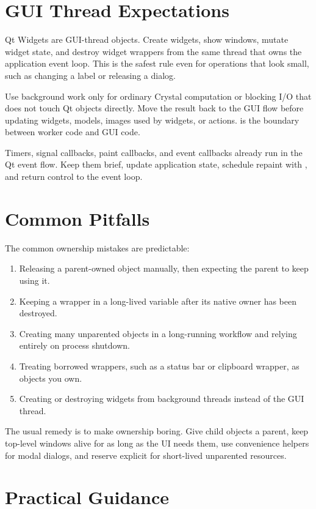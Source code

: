 \section{GUI Thread Expectations}

Qt Widgets are GUI-thread objects. Create widgets, show windows, mutate widget state, and destroy widget wrappers from the same thread that owns the application event loop. This is the safest rule even for operations that look small, such as changing a label or releasing a dialog.

Use background work only for ordinary Crystal computation or blocking I/O that does not touch Qt objects directly. Move the result back to the GUI flow before updating widgets, models, images used by widgets, or actions.  is the boundary between worker code and GUI code.

Timers, signal callbacks, paint callbacks, and event callbacks already run in the Qt event flow. Keep them brief, update application state, schedule repaint with , and return control to the event loop.

\section{Common Pitfalls}

The common ownership mistakes are predictable:

\begin{enumerate}
\item Releasing a parent-owned object manually, then expecting the parent to keep using it.
\item Keeping a wrapper in a long-lived variable after its native owner has been destroyed.
\item Creating many unparented objects in a long-running workflow and relying entirely on process shutdown.
\item Treating borrowed wrappers, such as a status bar or clipboard wrapper, as objects you own.
\item Creating or destroying widgets from background threads instead of the GUI thread.
\end{enumerate}

The usual remedy is to make ownership boring. Give child objects a parent, keep top-level windows alive for as long as the UI needs them, use convenience helpers for modal dialogs, and reserve explicit  for short-lived unparented resources.

\section{Practical Guidance}

